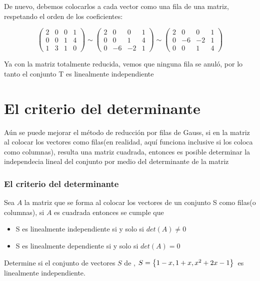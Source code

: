 
De nuevo, debemos colocarlos a cada vector como una fila de una matriz, respetando el orden de los coeficientes:

\[
\left(
\begin{array}{rrrr}
2&0&0&1\\
0&0&1&4\\
1&3&1&0
\end{array}
\right)
\sim
\left(
\begin{array}{rrrr}
2&0&0&1\\
0&0&1&4\\
0&-6&-2&1
\end{array}
\right)
\sim
\left(
\begin{array}{rrrr}
2&0&0&1\\
0&-6&-2&1\\
0&0&1&4
\end{array}
\right)
\]

Ya con la matriz totalmente reducida, vemos que ninguna fila se anul\'o, por lo tanto el conjunto T es linealmente independiente
\section{El criterio del determinante}
A\'un se puede mejorar el m\'etodo de reducción por filas de Gauss, si en la matriz al colocar los vectores como filas(en realidad, aqu\'i funciona inclusive si los coloca como columnas), resulta una matriz cuadrada, entonces es posible determinar la independecia lineal del conjunto por medio del determinante de la matriz

\subsubsection{El criterio del determinante}
\begin{theorem}
Sea $A$ la matriz que se forma al colocar los vectores de un conjunto S como filas(o columnas), si $A$ es cuadrada entonces se cumple que 
\begin{itemize}
\item S es linealmente independiente si y solo si $det(A)\neq 0$
\item S es linealmente dependiente si y solo si $det(A)=0$
\end{itemize}

\end{theorem}


\begin{ejemplo}
Determine si el conjunto de vectores $S$ de \pdos, $S= \left\{1-x, 1+x, x^2+2x-1 \right\} $\ es linealmente independiente.
\end{ejemplo}

